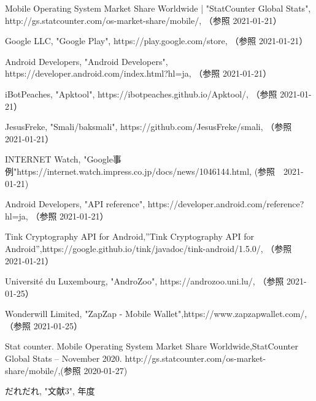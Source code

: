 \newpage
\begin{thebibliography}{99}

Mobile Operating System Market Share Worldwide |  "StatCounter Global Stats",
http://gs.statcounter.com/os-market-share/mobile/, （参照 2021-01-21）

Google LLC, "Google Play", https://play.google.com/store, （参照 2021-01-21）

Android Developers, "Android Developers", https://developer.android.com/index.html?hl=ja, （参照 2021-01-21）

iBotPeaches, "Apktool", https://ibotpeaches.github.io/Apktool/, （参照 2021-01-21）

JesusFreke, "Smali/baksmali", https://github.com/JesusFreke/smali, （参照 2021-01-21）


INTERNET Watch, "Google事例"https://internet.watch.impress.co.jp/docs/news/1046144.html, (参照　2021-01-21)

Android Developers, "API reference", https://developer.android.com/reference?hl=ja, （参照 2021-01-21）

Tink Cryptography API for Android,''Tink Cryptography API for Android'',https://google.github.io/tink/javadoc/tink-android/1.5.0/, （参照 2021-01-21）

Université du Luxembourg, "AndroZoo",  https://androzoo.uni.lu/, （参照 2021-01-25）

Wonderwill Limited, "ZapZap - Mobile Wallet",https://www.zapzapwallet.com/,（参照 2021-01-25）

Stat counter. Mobile Operating System Market Share Worldwide,StatCounter Global Stats – November 2020. http://gs.statcounter.com/os-market-share/mobile/,(参照 2020-01-27)

だれだれ, "文献3", 年度

\end{thebibliography}